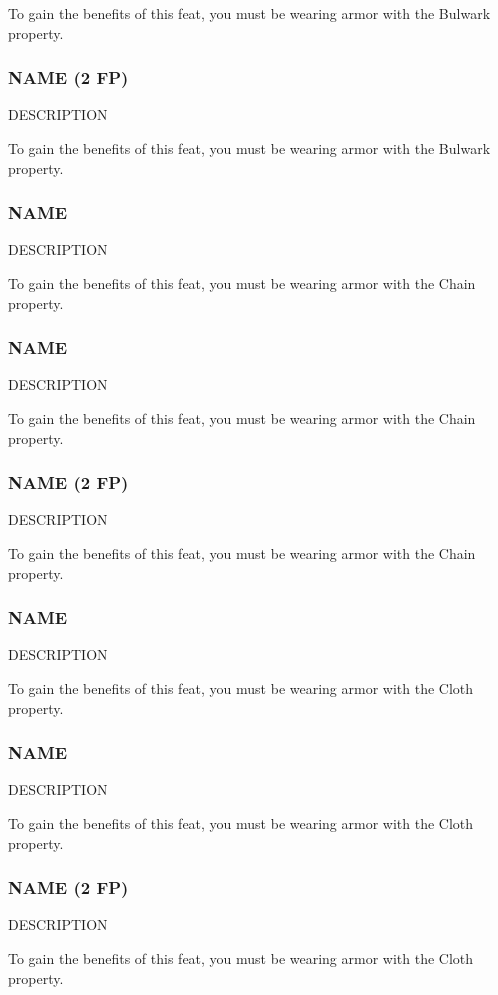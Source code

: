     To gain the benefits of this feat, you must be wearing armor with the Bulwark property.
\subsubsection{NAME (2 FP)} \label{feat::name}
    DESCRIPTION

    To gain the benefits of this feat, you must be wearing armor with the Bulwark property.
\subsubsection{NAME} \label{feat::name}
    DESCRIPTION

    To gain the benefits of this feat, you must be wearing armor with the Chain property.
\subsubsection{NAME} \label{feat::name}
    DESCRIPTION

    To gain the benefits of this feat, you must be wearing armor with the Chain property.
\subsubsection{NAME (2 FP)} \label{feat::name}
    DESCRIPTION

    To gain the benefits of this feat, you must be wearing armor with the Chain property.
\subsubsection{NAME} \label{feat::name}
    DESCRIPTION

    To gain the benefits of this feat, you must be wearing armor with the Cloth property.
\subsubsection{NAME} \label{feat::name}
    DESCRIPTION

    To gain the benefits of this feat, you must be wearing armor with the Cloth property.
\subsubsection{NAME (2 FP)} \label{feat::name}
    DESCRIPTION

    To gain the benefits of this feat, you must be wearing armor with the Cloth property.

